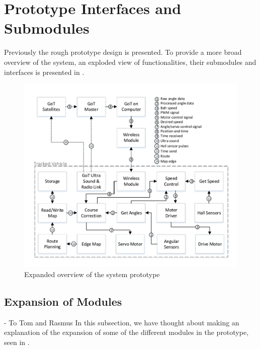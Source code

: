 \section{Prototype Interfaces and Submodules}
Previously the rough prototype design is presented. To provide a more broad overview of the system, an exploded view of functionalities, their submodules and interfaces is presented in .

\begin{figure}[H]
	\centering
	\includegraphics[scale=.9]{figures/systemOverview2}
	\caption{Expanded overview of the system prototype}
	\label{fig:systemOverview2}
\end{figure}

\subsection{Expansion of Modules}
- To Tom and Rasmus \newline
In this subsection, we have thought about making an explanation of the expansion of some of the different modules in the prototype, seen in .  

\indent

